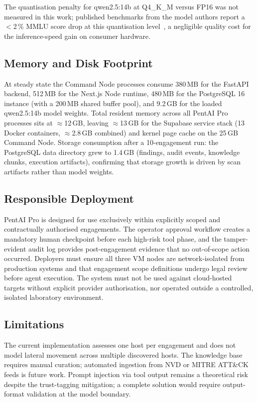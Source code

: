 \documentclass[conference]{IEEEtran}
\begin{document}
The quantisation penalty for qwen2.5:14b at Q4\_K\_M versus FP16 was
not measured in this work; published benchmarks from the model authors
report a $<$2\,\% MMLU score drop at this quantisation level~\cite{qwen2024},
a negligible quality cost for the inference-speed gain on consumer hardware.

\subsection{Memory and Disk Footprint}

At steady state the Command Node processes consume 380\,MB for the FastAPI
backend, 512\,MB for the Next.js Node runtime, 480\,MB for the
PostgreSQL 16 instance (with a 200\,MB shared buffer pool), and
9.2\,GB for the loaded qwen2.5:14b model weights.
Total resident memory across all PentAI Pro processes sits at
$\approx$12\,GB, leaving $\approx$13\,GB for the Supabase service
stack (13 Docker containers, $\approx$2.8\,GB combined) and kernel
page cache on the 25\,GB Command Node.
Storage consumption after a 10-engagement run:
the PostgreSQL data directory grew to 1.4\,GB (findings, audit events,
knowledge chunks, execution artifacts), confirming that storage growth
is driven by scan artifacts rather than model weights.

\subsection{Responsible Deployment}

PentAI Pro is designed for use exclusively within explicitly scoped
and contractually authorised engagements.
The operator approval workflow creates a mandatory human checkpoint
before each high-risk tool phase, and the tamper-evident audit log
provides post-engagement evidence that no out-of-scope action occurred.
Deployers must ensure all three VM nodes are network-isolated from
production systems and that engagement scope definitions undergo legal
review before agent execution.
The system must not be used against cloud-hosted targets without
explicit provider authorisation, nor operated outside a controlled,
isolated laboratory environment.

\subsection{Limitations}

The current implementation assesses one host per engagement and does
not model lateral movement across multiple discovered hosts.
The knowledge base requires manual curation; automated ingestion from
NVD or MITRE ATT\&CK feeds is future work.
Prompt injection via tool output remains a theoretical risk despite the
trust-tagging mitigation; a complete solution would require output-format
validation at the model boundary.
\end{document}

